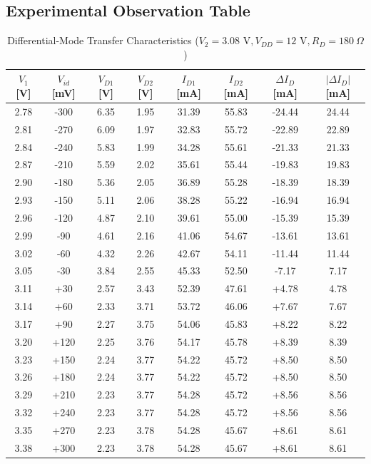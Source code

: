 \documentclass[11pt,a4paper]{article}
\begin{document}
\subsection{Experimental Observation Table}
\begin{table}[H]
\centering
\caption{Differential-Mode Transfer Characteristics ($V_2 = 3.08\text{ V}, V_{DD} = 12\text{ V}, R_D = 180\ \Omega$)}
\label{tab:sheet3}
\small
\begin{tabular}{@{}cccccccc@{}}
\toprule
\textbf{$V_1$ [V]} & \textbf{$V_{id}$ [mV]} & \textbf{$V_{D1}$ [V]} & \textbf{$V_{D2}$ [V]} & \textbf{$I_{D1}$ [mA]} & \textbf{$I_{D2}$ [mA]} & \textbf{$\Delta I_D$ [mA]} & \textbf{$|\Delta I_D|$ [mA]} \\ \midrule
2.78 & -300 & 6.35 & 1.95 & 31.39 & 55.83 & -24.44 & 24.44 \\
2.81 & -270 & 6.09 & 1.97 & 32.83 & 55.72 & -22.89 & 22.89 \\
2.84 & -240 & 5.83 & 1.99 & 34.28 & 55.61 & -21.33 & 21.33 \\
2.87 & -210 & 5.59 & 2.02 & 35.61 & 55.44 & -19.83 & 19.83 \\
2.90 & -180 & 5.36 & 2.05 & 36.89 & 55.28 & -18.39 & 18.39 \\
2.93 & -150 & 5.11 & 2.06 & 38.28 & 55.22 & -16.94 & 16.94 \\
2.96 & -120 & 4.87 & 2.10 & 39.61 & 55.00 & -15.39 & 15.39 \\
2.99 & -90  & 4.61 & 2.16 & 41.06 & 54.67 & -13.61 & 13.61 \\
3.02 & -60  & 4.32 & 2.26 & 42.67 & 54.11 & -11.44 & 11.44 \\
3.05 & -30  & 3.84 & 2.55 & 45.33 & 52.50 & -7.17  & 7.17  \\
3.11 & +30  & 2.57 & 3.43 & 52.39 & 47.61 & +4.78  & 4.78  \\
3.14 & +60  & 2.33 & 3.71 & 53.72 & 46.06 & +7.67  & 7.67  \\
3.17 & +90  & 2.27 & 3.75 & 54.06 & 45.83 & +8.22  & 8.22  \\
3.20 & +120 & 2.25 & 3.76 & 54.17 & 45.78 & +8.39  & 8.39  \\
3.23 & +150 & 2.24 & 3.77 & 54.22 & 45.72 & +8.50  & 8.50  \\
3.26 & +180 & 2.24 & 3.77 & 54.22 & 45.72 & +8.50  & 8.50  \\
3.29 & +210 & 2.23 & 3.77 & 54.28 & 45.72 & +8.56  & 8.56  \\
3.32 & +240 & 2.23 & 3.77 & 54.28 & 45.72 & +8.56  & 8.56  \\
3.35 & +270 & 2.23 & 3.78 & 54.28 & 45.67 & +8.61  & 8.61  \\
3.38 & +300 & 2.23 & 3.78 & 54.28 & 45.67 & +8.61  & 8.61  \\
\bottomrule
\end{tabular}
\end{table}
\end{document}

